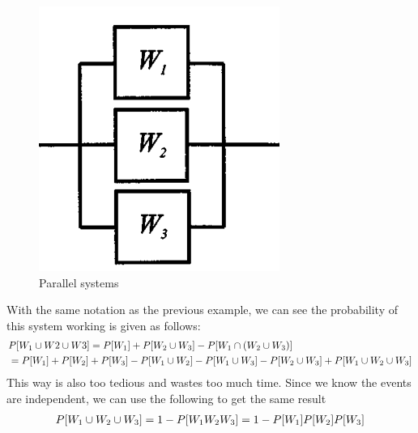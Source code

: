 \documentclass[12pt, titlepage, oneside]{article}
\begin{document}
\ex
\begin{figure}[h]
	\centering
	\includegraphics[width=0.4\linewidth]{../Lecture4/images/parallel}
	\caption{Parallel systems}
	\label{fig:parallel}
\end{figure}

With the same notation as the previous example, we can see the probability of this system working is given as follows:
\begin{align}
&P[W_1 \cup W2 \cup W3] = P[W_1] + P[W_2 \cup W_3] - P[W_1 \cap (W_2 \cup W_3)]\\
&= P[W_1] + P[W_2] + P[W_3] - P[W_1\cup W_2] - P[W_1 \cup W_3] - P[W_2 \cup W_3] + P[W_1 \cup W_2 \cup W_3]
\end{align}
This way is also too tedious and wastes too much time. Since we know the events are independent, we can use the following to get the same result
\begin{align}
P[W_1 \cup W_2 \cup W_3] = 1- P[W_1 W_2 W_3] = 1-P[W_1]P[W_2]P[W_3]
\end{align}
\end{document}
